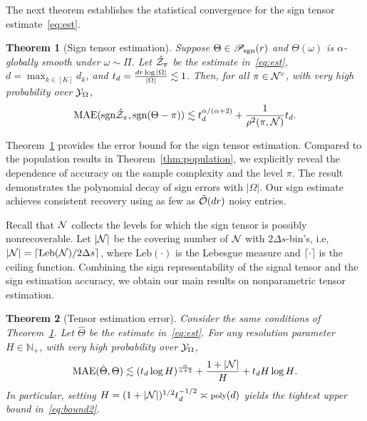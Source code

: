 \documentclass[twoside,11pt]{article}
\theoremstyle{plain}
\newtheorem{thm}{Theorem}
\theoremstyle{definition}
\def\sign{\textup{sgn}}
\def\caliP{\mathscr{P}_{\textup{sgn}}}
\begin{document}
The next theorem establishes the statistical convergence for the sign tensor estimate~\eqref{eq:est}.

\begin{thm}[Sign tensor estimation]\label{thm:classification} Suppose $\Theta\in\caliP(r)$ and $\Theta(\omega)$ is $\alpha$-globally smooth under $\omega\sim \Pi$. Let $\hat {\mathcal{Z}}_\pi$ be the estimate in~\eqref{eq:est}, $d=\max_{k\in[K]}d_k$, and $t_d ={dr\log|\Omega|\over |\Omega|}\lesssim 1$. Then, for all $\pi\in\mathcal{N}^c$, with very high probability over $\mathcal{Y}_\Omega$, 
\begin{align}\label{eq:bound}
\textup{MAE}(\sign \hat \tZ_\pi, \sign(\Theta-\pi)) \lesssim t_d^{\alpha/( \alpha+2)}+{1 \over \rho^2(\pi, \tN)}t_d.
\end{align}
\end{thm}
Theorem~\ref{thm:classification} provides the error bound for the sign tensor estimation. Compared to the population results in Theorem~\ref{thm:population}, we explicitly reveal the dependence of accuracy on the sample complexity and the level $\pi$. The result demonstrates the polynomial decay of sign errors with $|\Omega|$.  Our sign estimate achieves consistent recovery using as few as $\tilde {\mathcal{O}}(dr)$ noisy entries. 

Recall that $\mathcal{N}$ collects the levels for which the sign tensor is possibly nonrecoverable. Let $|\mathcal{N}|$ be the covering number of $\mathcal{N}$ with $2\Delta s$-bin's, i.e, $|\mathcal{N}| = \lceil \text{Leb}(\mathcal{N})/2\Delta s \rceil$, where $\text{Leb}(\cdot)$ is the Lebesgue measure and $\lceil \cdot \rceil$ is the ceiling function. Combining the sign representability of the signal tensor and the sign estimation accuracy, we obtain our main results on nonparametric tensor estimation. 

\begin{thm}[Tensor estimation error]\label{thm:estimation} Consider the same conditions of Theorem~\ref{thm:classification}. Let $\hat \Theta$ be the estimate in~\eqref{eq:est}. For any resolution parameter $H\in\mathbb{N}_{+}$, with very high probability over $\mathcal{Y}_\Omega$,
\begin{equation}\label{eq:bound2}
\textup{MAE}(\hat \Theta, \Theta)\lesssim (t_d\log H)^{\alpha\over \alpha+2}+{1+|\mathcal{N}|\over H}+{t_dH\log H}.
\end{equation}
In particular, setting $\footnotesize H= (1+|\mathcal{N}|)^{1/2} t_d^{-1/2}\asymp \text{poly}(d)$ yields the tightest upper bound in~\eqref{eq:bound2}.
\end{thm}
\end{document}
